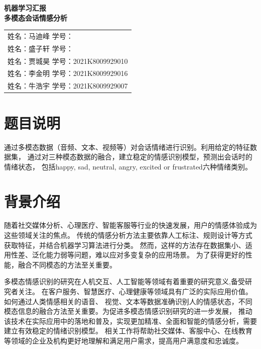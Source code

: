 \documentclass[11pt]{article}
\begin{document}
\begin{titlepage}
    \centering
    \Huge\bfseries 机器学习汇报\\
    \huge 多模态会话情感分析\\
    \mdseries
    \large
    \begin{tabular}{l}
        {姓名：马迪峰}
        {学号：}\\
        {姓名：盛子轩}
        {学号：}\\
        {姓名：贾城昊}
        {学号：2021K8009929010}\\
        {姓名：李金明}
        {学号：2021K8009929016}\\
        {姓名：牛浩宇}
        {学号：2021K8009929007}\\
    \end{tabular}
\end{titlepage}

\tableofcontents

\newpage


    \section{题目说明}
    通过多模态数据（音频、文本、视频等）对会话情绪进行识别。利用给定的特征数据集，
    通过对三种模态数据的融合，建立稳定的情感识别模型，预测出会话时的情绪状态，
    包括happy, sad, neutral, angry, excited or frustrated六种情绪类别。


    \section{背景介绍}
    随着社交媒体分析、心理医疗、智能客服等行业的快速发展，用户的情感体验成为这些领域关注的焦点。
    传统的情感分析方法主要依靠人工标注、规则设计等方式获取特征，并结合机器学习算法进行分类。
    然而，这样的方法存在数据集小、适用性差、泛化能力弱等问题，难以应对多变复杂的应用场景。
    为了获得更好的性能，融合不同模态的方法至关重要。

    多模态情感识别的研究在人机交互、人工智能等领域有着重要的研究意义,备受研究者关注。
    在客户服务、智慧医疗、心理健康等领域具有广泛的实际应用价值。如何通过人类情感相关的语音、
    视觉、文本等数据准确识别人的情感状态，不同模态信息的融合方法至关重要。为促进多模态情感识别研究的进一步发展，
    推动该技术在实际应用中的落地和普及，实现更加精准、全面和智能的情感分析，需要建立有效稳定的情绪识别模型。
    相关工作将帮助社交媒体、客服中心、在线教育等领域的企业及机构更好地理解和满足用户需求，提高用户满意度和忠诚度。
\end{document}
